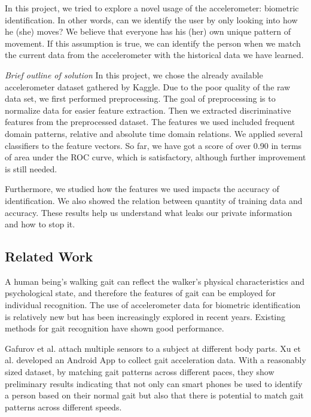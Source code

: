 \documentclass{article} %
\begin{document}
In this project, we tried to explore a novel usage of the accelerometer: biometric identification. In other words, can we identify the user by only looking into how he (she) moves? We believe that everyone has his (her) own unique pattern of movement. If this assumption is true, we can identify the person when we match the current data from the accelerometer with the historical data we have learned. 

\emph{Brief outline of solution} In this project, we chose the already available accelerometer dataset gathered by Kaggle. Due to the poor quality of the raw data set, we first performed preprocessing. The goal of preprocessing is to normalize data for easier feature extraction. Then we extracted discriminative features from the preprocessed dataset. The features we used included frequent domain patterns, relative and absolute time domain relations. We applied several classifiers to the feature vectors. So far, we have got a score of over 0.90 in terms of area under the ROC curve, which is satisfactory, although further improvement is still needed.

Furthermore, we studied how the features we used impacts the accuracy of identification. We also showed the relation between quantity of training data and accuracy. These results help us understand what leaks our private information and how to stop it.






\subsection{Related Work} 

A human being's walking gait can reflect the walker's physical characteristics and psychological state, and therefore the features of gait can be employed for individual recognition. The use of accelerometer data for biometric identification is relatively new but has been increasingly explored in recent years. Existing methods for gait recognition have shown good performance.
 
Gafurov et al. \cite{Gafurov:AIAT2007} attach multiple sensors to a subject at different body parts. Xu et al. \cite{Xu:ICB2012} developed an Android App to collect gait acceleration data. With a reasonably sized dataset, by matching gait patterns across different paces, they show preliminary results indicating that not only can smart phones be used to identify a person based on their normal gait but also that there is potential to match gait patterns across different speeds.
\end{document}
